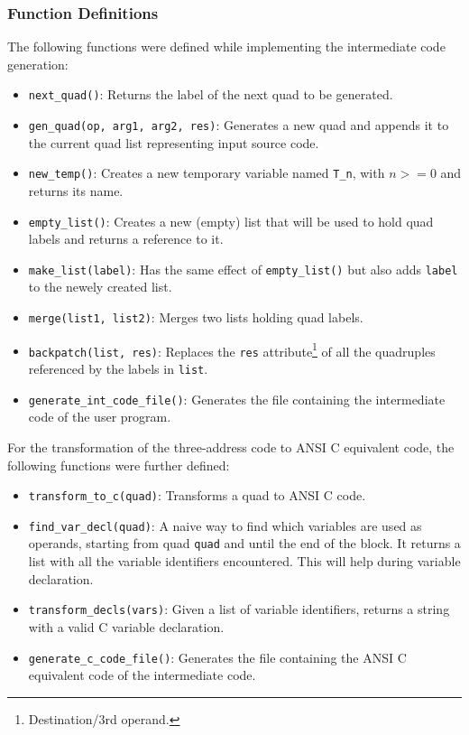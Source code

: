 \documentclass{article}
\def\code#1{\texttt{#1}} %
\begin{document}
\subsubsection{Function Definitions}
The following functions were defined while implementing the intermediate code generation:
\begin{itemize}
 \item \code{next\_quad()}: Returns the label of the next quad to be generated.
 \item \code{gen\_quad(op, arg1, arg2, res)}: Generates a new quad and appends it to the current quad list
                                              representing input source code.
 \item \code{new\_temp()}: Creates a new temporary variable named \code{T\_n}, with $n>=0$ and returns its name.
 \item \code{empty\_list()}: Creates a new (empty) list that will be used to hold quad labels
                             and returns a reference to it.
 \item \code{make\_list(label)}: Has the same effect of \code{empty\_list()} but also adds \code{label} to the
                                 newely created list.
 \item \code{merge(list1, list2)}: Merges two lists holding quad labels.
 \item \code{backpatch(list, res)}: Replaces the \code{res} attribute\footnote{Destination/3rd operand.} 
                                    of all the quadruples referenced by the labels in \code{list}.
 \item \code{generate\_int\_code\_file()}: Generates the file containing the intermediate code of the user program.
\end{itemize}


For the transformation of the three-address code to ANSI C equivalent code, the following functions
were further defined:
\begin{itemize}
 \item \code{transform\_to\_c(quad)}: Transforms a quad to ANSI C code.
 \item \code{find\_var\_decl(quad)}: A naive way to find which variables are used as operands, starting from
                                     quad \code{quad} and until the end of the block. It returns a list with all
                                     the variable identifiers encountered. This will help during variable declaration.
 \item \code{transform\_decls(vars)}: Given a list of variable identifiers, returns a string with a valid C
                                      variable declaration.
 \item \code{generate\_c\_code\_file()}: Generates the file containing the ANSI C equivalent code of the
                                         intermediate code.
\end{itemize}
\end{document}
